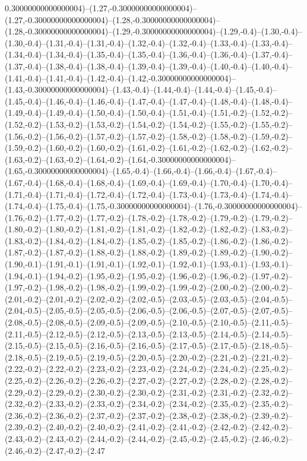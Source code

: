 0.30000000000000004)--(1.27,-0.30000000000000004)--(1.27,-0.30000000000000004)--(1.28,-0.30000000000000004)--(1.28,-0.30000000000000004)--(1.29,-0.30000000000000004)--(1.29,-0.4)--(1.30,-0.4)--(1.30,-0.4)--(1.31,-0.4)--(1.31,-0.4)--(1.32,-0.4)--(1.32,-0.4)--(1.33,-0.4)--(1.33,-0.4)--(1.34,-0.4)--(1.34,-0.4)--(1.35,-0.4)--(1.35,-0.4)--(1.36,-0.4)--(1.36,-0.4)--(1.37,-0.4)--(1.37,-0.4)--(1.38,-0.4)--(1.38,-0.4)--(1.39,-0.4)--(1.39,-0.4)--(1.40,-0.4)--(1.40,-0.4)--(1.41,-0.4)--(1.41,-0.4)--(1.42,-0.4)--(1.42,-0.30000000000000004)--(1.43,-0.30000000000000004)--(1.43,-0.4)--(1.44,-0.4)--(1.44,-0.4)--(1.45,-0.4)--(1.45,-0.4)--(1.46,-0.4)--(1.46,-0.4)--(1.47,-0.4)--(1.47,-0.4)--(1.48,-0.4)--(1.48,-0.4)--(1.49,-0.4)--(1.49,-0.4)--(1.50,-0.4)--(1.50,-0.4)--(1.51,-0.4)--(1.51,-0.2)--(1.52,-0.2)--(1.52,-0.2)--(1.53,-0.2)--(1.53,-0.2)--(1.54,-0.2)--(1.54,-0.2)--(1.55,-0.2)--(1.55,-0.2)--(1.56,-0.2)--(1.56,-0.2)--(1.57,-0.2)--(1.57,-0.2)--(1.58,-0.2)--(1.58,-0.2)--(1.59,-0.2)--(1.59,-0.2)--(1.60,-0.2)--(1.60,-0.2)--(1.61,-0.2)--(1.61,-0.2)--(1.62,-0.2)--(1.62,-0.2)--(1.63,-0.2)--(1.63,-0.2)--(1.64,-0.2)--(1.64,-0.30000000000000004)--(1.65,-0.30000000000000004)--(1.65,-0.4)--(1.66,-0.4)--(1.66,-0.4)--(1.67,-0.4)--(1.67,-0.4)--(1.68,-0.4)--(1.68,-0.4)--(1.69,-0.4)--(1.69,-0.4)--(1.70,-0.4)--(1.70,-0.4)--(1.71,-0.4)--(1.71,-0.4)--(1.72,-0.4)--(1.72,-0.4)--(1.73,-0.4)--(1.73,-0.4)--(1.74,-0.4)--(1.74,-0.4)--(1.75,-0.4)--(1.75,-0.30000000000000004)--(1.76,-0.30000000000000004)--(1.76,-0.2)--(1.77,-0.2)--(1.77,-0.2)--(1.78,-0.2)--(1.78,-0.2)--(1.79,-0.2)--(1.79,-0.2)--(1.80,-0.2)--(1.80,-0.2)--(1.81,-0.2)--(1.81,-0.2)--(1.82,-0.2)--(1.82,-0.2)--(1.83,-0.2)--(1.83,-0.2)--(1.84,-0.2)--(1.84,-0.2)--(1.85,-0.2)--(1.85,-0.2)--(1.86,-0.2)--(1.86,-0.2)--(1.87,-0.2)--(1.87,-0.2)--(1.88,-0.2)--(1.88,-0.2)--(1.89,-0.2)--(1.89,-0.2)--(1.90,-0.2)--(1.90,-0.1)--(1.91,-0.1)--(1.91,-0.1)--(1.92,-0.1)--(1.92,-0.1)--(1.93,-0.1)--(1.93,-0.1)--(1.94,-0.1)--(1.94,-0.2)--(1.95,-0.2)--(1.95,-0.2)--(1.96,-0.2)--(1.96,-0.2)--(1.97,-0.2)--(1.97,-0.2)--(1.98,-0.2)--(1.98,-0.2)--(1.99,-0.2)--(1.99,-0.2)--(2.00,-0.2)--(2.00,-0.2)--(2.01,-0.2)--(2.01,-0.2)--(2.02,-0.2)--(2.02,-0.5)--(2.03,-0.5)--(2.03,-0.5)--(2.04,-0.5)--(2.04,-0.5)--(2.05,-0.5)--(2.05,-0.5)--(2.06,-0.5)--(2.06,-0.5)--(2.07,-0.5)--(2.07,-0.5)--(2.08,-0.5)--(2.08,-0.5)--(2.09,-0.5)--(2.09,-0.5)--(2.10,-0.5)--(2.10,-0.5)--(2.11,-0.5)--(2.11,-0.5)--(2.12,-0.5)--(2.12,-0.5)--(2.13,-0.5)--(2.13,-0.5)--(2.14,-0.5)--(2.14,-0.5)--(2.15,-0.5)--(2.15,-0.5)--(2.16,-0.5)--(2.16,-0.5)--(2.17,-0.5)--(2.17,-0.5)--(2.18,-0.5)--(2.18,-0.5)--(2.19,-0.5)--(2.19,-0.5)--(2.20,-0.5)--(2.20,-0.2)--(2.21,-0.2)--(2.21,-0.2)--(2.22,-0.2)--(2.22,-0.2)--(2.23,-0.2)--(2.23,-0.2)--(2.24,-0.2)--(2.24,-0.2)--(2.25,-0.2)--(2.25,-0.2)--(2.26,-0.2)--(2.26,-0.2)--(2.27,-0.2)--(2.27,-0.2)--(2.28,-0.2)--(2.28,-0.2)--(2.29,-0.2)--(2.29,-0.2)--(2.30,-0.2)--(2.30,-0.2)--(2.31,-0.2)--(2.31,-0.2)--(2.32,-0.2)--(2.32,-0.2)--(2.33,-0.2)--(2.33,-0.2)--(2.34,-0.2)--(2.34,-0.2)--(2.35,-0.2)--(2.35,-0.2)--(2.36,-0.2)--(2.36,-0.2)--(2.37,-0.2)--(2.37,-0.2)--(2.38,-0.2)--(2.38,-0.2)--(2.39,-0.2)--(2.39,-0.2)--(2.40,-0.2)--(2.40,-0.2)--(2.41,-0.2)--(2.41,-0.2)--(2.42,-0.2)--(2.42,-0.2)--(2.43,-0.2)--(2.43,-0.2)--(2.44,-0.2)--(2.44,-0.2)--(2.45,-0.2)--(2.45,-0.2)--(2.46,-0.2)--(2.46,-0.2)--(2.47,-0.2)--(2.47